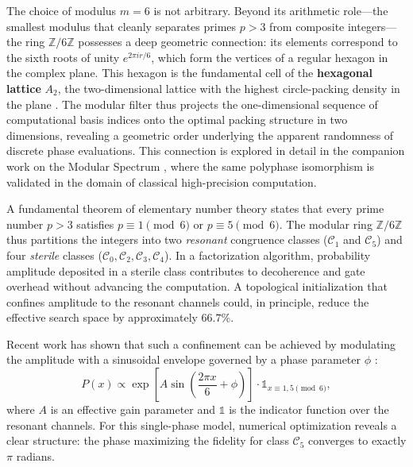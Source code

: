\documentclass[12pt,a4paper]{article}
\theoremstyle{plain}
\theoremstyle{definition}
\theoremstyle{remark}
\begin{document}
The choice of modulus \(m=6\) is not arbitrary. Beyond its arithmetic role---the smallest modulus that cleanly separates primes \(p>3\) from composite integers---the ring \(\mathbb{Z}/6\mathbb{Z}\) possesses a deep geometric connection: its elements correspond to the sixth roots of unity \(e^{2\pi i r/6}\), which form the vertices of a regular hexagon in the complex plane. This hexagon is the fundamental cell of the \textbf{hexagonal lattice} \(A_2\), the two-dimensional lattice with the highest circle-packing density in the plane \cite{conway1999sphere}. The modular filter thus projects the one-dimensional sequence of computational basis indices onto the optimal packing structure in two dimensions, revealing a geometric order underlying the apparent randomness of discrete phase evaluations. This connection is explored in detail in the companion work on the Modular Spectrum \cite{ModularSpectrum}, where the same polyphase isomorphism is validated in the domain of classical high-precision computation.

A fundamental theorem of elementary number theory states that every prime number \(p > 3\) satisfies \(p \equiv 1 \pmod{6}\) or \(p \equiv 5 \pmod{6}\). The modular ring \(\mathbb{Z}/6\mathbb{Z}\) thus partitions the integers into two \emph{resonant} congruence classes (\(\mathcal{C}_1\) and \(\mathcal{C}_5\)) and four \emph{sterile} classes (\(\mathcal{C}_0, \mathcal{C}_2, \mathcal{C}_3, \mathcal{C}_4\)). In a factorization algorithm, probability amplitude deposited in a sterile class contributes to decoherence and gate overhead without advancing the computation. A topological initialization that confines amplitude to the resonant channels could, in principle, reduce the effective search space by approximately \(66.7\%\).

Recent work has shown that such a confinement can be achieved by modulating the amplitude with a sinusoidal envelope governed by a phase parameter \(\phi\) \cite{Peinador_Isomorfismo_DSP_2025}:
\begin{equation}
P(x) \propto \exp\left[A \sin\left(\frac{2\pi x}{6} + \phi\right)\right] \cdot \mathds{1}_{x \equiv 1,5 \pmod{6}},
\label{eq:amplitude}
\end{equation}
where \(A\) is an effective gain parameter and \(\mathds{1}\) is the indicator function over the resonant channels. For this single-phase model, numerical optimization reveals a clear structure: the phase maximizing the fidelity for class \(\mathcal{C}_5\) converges to exactly \(\pi\) radians.
\end{document}
